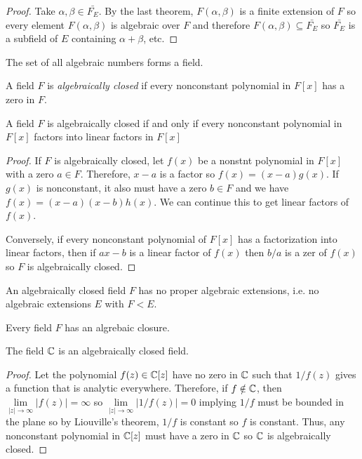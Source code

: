 \begin{proof}
    Take $\alpha, \beta \in \bar{F_E}$. By the last theorem, $F(\alpha, \beta)$ is a finite extension of $F$ so every element $F(\alpha, \beta)$ is algebraic over $F$ and therefore $F(\alpha, \beta) \subseteq \bar{F_E}$ so $\bar{F_E}$ is a subfield of $E$ containing $\alpha + \beta$, etc.
\end{proof}
\begin{corollary}
    The set of all algebraic numbers forms a field.
\end{corollary}
\begin{definition}
    A field $F$ is \emph{algebraically closed} if every nonconstant polynomial in $F[x]$ has a zero in $F$.
\end{definition}
\begin{theorem}
    A field $F$ is algebraically closed if and only if every nonconstant polynomial in $F[x]$ factors into linear factors in $F[x]$
\end{theorem}
\begin{proof}
    If $F$ is algebraically closed, let $f(x)$ be a nonstnt polynomial in $F[x]$ with a zero $a \in F$. Therefore, $x-a$ is a factor so $f(x) = (x-a)g(x)$. If $g(x)$ is nonconstant, it also must have a zero $b \in F$ and we have $f(x) = (x-a)(x-b)h(x)$. We can continue this to get linear factors of $f(x)$.

    Conversely, if every nonconstant polynomial of $F[x]$ has a factorization into linear factors, then if $ax-b$ is a linear factor of $f(x)$ then $b/a$ is a zer of $f(x)$ so $F$ is algebraically closed.
\end{proof}
\begin{corollary}
    An algebraically closed field $F$ has no proper algebraic extensions, i.e. no algebraic extensions $E$ with $F<E$.
\end{corollary}
\begin{theorem}
    Every field $F$ has an algrebaic closure.
\end{theorem}
\begin{theorem}
    The field $\mathbb{C}$ is an algebraically closed field.    
\end{theorem}
\begin{proof}
    Let the polynomial $f(z) \in \mathbb{C}[z]$ have no zero in $\mathbb{C}$ such that $1/f(z)$ gives a function that is analytic everywhere. Therefore, if $f \notin \mathbb{C}$, then $\lim\limits_{|z|\to\infty}|f(z)| = \infty$ so $\lim\limits_{|z|\to\infty}|1/f(z)| = 0$ implying $1/f$ must be bounded in the plane so by Liouville's theorem, $1/f$ is constant so $f$ is constant. Thus, any nonconstant polynomial in $\mathbb{C}[z]$ must have a zero in $\mathbb{C}$ so $\mathbb{C}$ is algebraically closed.
\end{proof}
